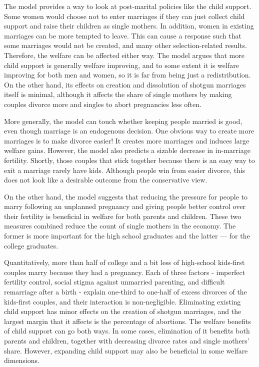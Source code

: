 \documentclass[12pt,letter]{article}
\begin{document}
The model provides a way to look at post-marital policies like the child support. Some women would choose not to enter marriages if they can just collect child support and raise their children as single mothers. In addition, women in existing marriages can be more tempted to leave. This can cause a response such that some marriages would not be created, and many other selection-related results. Therefore, the welfare can be affected either way. The model argues that more child support is generally welfare improving, and to some extent it is welfare improving for both men and women, so it is far from being just a redistribution. On the other hand, its effects on creation and dissolution of shotgun marriages itself is minimal, although it affects the share of single mothers by making couples divorce more and singles to abort pregnancies less often.

More generally, the model can touch whether keeping people married is good, even though marriage is an endogenous decision. One obvious way to create more marriages is to make divorce easier! It creates more marriages and induces large welfare gains. However, the model also predicts a sizable decrease in in-marriage fertility. Shortly, those couples that stick together because there is an easy way to exit a marriage rarely have kids. Although people win from easier divorce, this does not look like a desirable outcome from the conservative view.

On the other hand, the model suggests that reducing the pressure for people to marry following an unplanned pregnancy and giving people better control over their fertility is beneficial in welfare for both parents and children. These two measures combined reduce the count of single mothers in the economy. The former is more important for the high school graduates and the latter --- for the college graduates. 

Quantitatively, more than half of college and a bit less of high-school kids-first couples marry because they had a pregnancy. Each of three factors - imperfect fertility control, social stigma against unmarried parenting, and difficult remarriage after a birth - explain one-third to one-half of excess divorces of the kids-first couples, and their interaction is non-negligible. Eliminating existing child support has minor effects on the creation of shotgun marriages, and the largest margin that it affects is the percentage of abortions. The welfare benefits of child support can go both ways. In some cases, elimination of it benefits both parents and children, together with decreasing divorce rates and single mothers' share. However, expanding child support may also be beneficial in some welfare dimensions.
\end{document}
